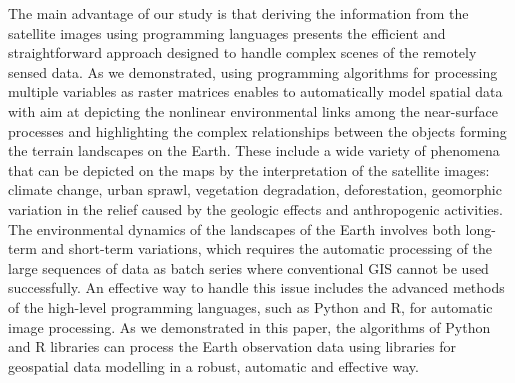 \documentclass[ijgi,article,submit,pdftex,moreauthors]{Definitions/mdpi}
\begin{document}
The main advantage of our study is that deriving the information from the satellite images using programming languages presents the efficient and straightforward approach designed to handle complex scenes of the remotely sensed data. As we demonstrated, using programming algorithms for processing multiple variables as raster matrices enables to automatically model spatial data with aim at depicting the nonlinear environmental links among the near-surface processes and highlighting the complex relationships between the objects forming the terrain landscapes on the Earth. These include a wide variety of phenomena that can be depicted on the maps by the interpretation of the satellite images: climate change, urban sprawl, vegetation degradation, deforestation, geomorphic variation in the relief caused by the geologic effects and anthropogenic activities. The environmental dynamics of the landscapes of the Earth involves both long-term and short-term variations, which requires the automatic processing of the large sequences of data as batch series where conventional GIS cannot be used successfully. An effective way to handle this issue includes the advanced methods of the high-level programming languages, such as Python and R, for automatic image processing. As we demonstrated in this paper, the algorithms of Python and R libraries can process the Earth observation data using libraries for geospatial data modelling in a robust, automatic and effective way.







\end{document}
